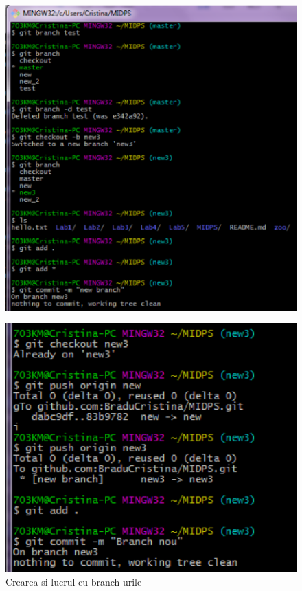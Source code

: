 \documentclass[11pt]{article}
\begin{document}
\begin{figure}[h]
\includegraphics{images/15.eps}
\end{figure}

\begin{figure}[h]
\includegraphics{images/16.eps}
\caption{Crearea si lucrul cu branch-urile}
\end{figure}
\end{document}
